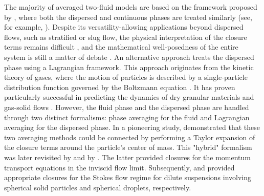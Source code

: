 The majority of averaged two-fluid models are based on the framework proposed by \citet{drew1983mathematical}, where both the dispersed and continuous phases are treated similarly (see, for example, \citet{hu2021cfd}). 
Despite its versatility-allowing applications beyond dispersed flows, such as stratified or slug flow, the physical interpretation of the closure terms remains difficult \citep{drew1983mathematical}, and the mathematical well-posedness of the entire system is still a matter of debate \citep{panicker2018hyperbolicity, lhuillier2013}.
An alternative approach treats the dispersed phase using a Lagrangian framework. 
This approach originates from the kinetic theory of gases, where the motion of particles is described by a single-particle distribution function governed by the Boltzmann equation \citep{chapman1990mathematical}. 
It has proven particularly successful in predicting the dynamics of dry granular materials \citep{rao2008introduction} and gas-solid flows \citep{simonin1996}. 
However, the fluid phase and the dispersed phase are handled through two distinct formalisms: phase averaging for the fluid and Lagrangian averaging for the dispersed phase.
In a pioneering study, \citet{buyevich1979flow} demonstrated that these two averaging methods could be connected by performing a Taylor expansion of the closure terms around the particle’s center of mass. 
This "hybrid" formalism was later revisited by \citet{lhuillier1992ensemble} and by \citet{zhang1994averaged, zhang1994ensemble}. The latter provided closures for the momentum transport equations in the inviscid flow limit. 
Subsequently, \citet{jackson1997locally} and \citet{zhang1997momentum} provided appropriate closures for the Stokes flow regime for dilute suspensions involving spherical solid particles and spherical droplets, respectively. %

